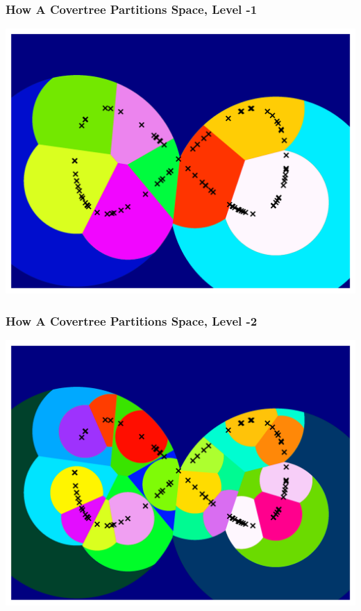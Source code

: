 \documentclass{beamer}
\begin{document}
\begin{frame}
\frametitle{How A Covertree Partitions Space, Level -1}
\begin{center}
    \includegraphics[scale=0.6]{partition_2.png}
\end{center}
\end{frame}

\begin{frame}
\frametitle{How A Covertree Partitions Space, Level -2}
\begin{center}
    \includegraphics[scale=0.6]{partition_3.png}
\end{center}
\end{frame}
\end{document}
